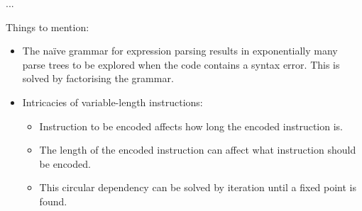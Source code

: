 ...

{
  \color{red}
  Things to mention:

  \begin{itemize}
    \item
      The na\"ive grammar for expression parsing results in exponentially many
      parse trees to be explored when the code contains a syntax error. This is
      solved by factorising the grammar.
    \item
      Intricacies of variable-length instructions:
      \begin{itemize}
        \item
          Instruction to be encoded affects how long the encoded instruction is.
        \item
          The length of the encoded instruction can affect what instruction
          should be encoded.
        \item
          This circular dependency can be solved by iteration until a fixed
          point is found.
      \end{itemize}
  \end{itemize}
}
